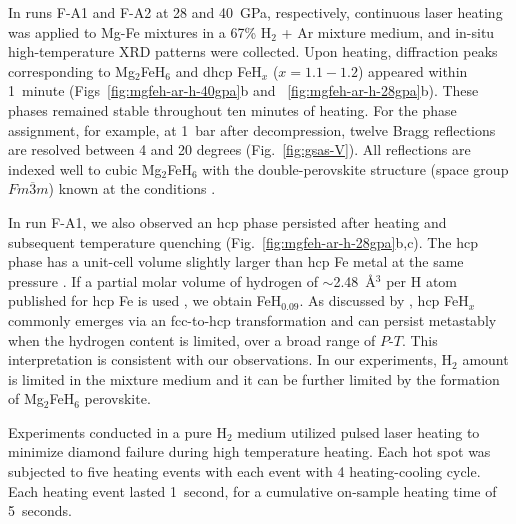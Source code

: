 \documentclass[draft,jgrga,12pt]{agujournal2019}
\begin{document}
In runs F-A1 and F-A2 at 28 and 40~{GPa}, respectively, continuous laser heating was applied to Mg-Fe mixtures in a 67\% H$_2$ + Ar mixture medium, and in-situ high-temperature XRD patterns were collected. 
Upon heating, diffraction peaks corresponding to Mg$_2$FeH$_6$ and dhcp FeH$_x$ ($x =1.1{-}1.2$) appeared within 1~minute (Figs~\ref{fig:mgfeh-ar-h-40gpa}b and ~\ref{fig:mgfeh-ar-h-28gpa}b). 
These phases remained stable throughout ten minutes of heating. 
For the phase assignment, for example, at 1~bar after decompression, twelve Bragg reflections are resolved between 4 and 20 degrees (Fig.~\ref{fig:gsas-V}). 
All reflections are indexed well to cubic Mg$_2$FeH$_6$ with the double-perovskite structure (space group $Fm\overline{3}m$) known at the conditions \cite{didisheim_dimagnesium_1984, retuerto_highpressure_2010}. 

In run F-A1, we also observed an hcp phase persisted after heating and subsequent temperature quenching (Fig.~\ref{fig:mgfeh-ar-h-28gpa}b,c).
The hcp phase has a unit-cell volume slightly larger than hcp Fe metal at the same pressure \cite{dewaele_quasihydrostatic_2006}.
If a partial molar volume of hydrogen of $\sim$2.48~{\AA}$^3$ per H atom published for hcp Fe is used , we obtain FeH$_{0.09}$. 
As discussed by , hcp FeH$_x$ commonly emerges via an fcc-to-hcp transformation and can persist metastably when the hydrogen content is limited, over a broad range of $P$-$T$.
This interpretation is consistent with our observations.
In our experiments, H$_2$ amount is limited in the mixture medium and it can be further limited by the formation of Mg$_2$FeH$_6$ perovskite. 



Experiments conducted in a pure H$_2$ medium utilized pulsed laser heating to minimize diamond failure during high temperature heating.  %
Each hot spot was subjected to five heating events with each event with 4 heating-cooling cycle.
Each heating event lasted 1~second, for a cumulative on-sample heating time of 5~seconds. 
\end{document}
